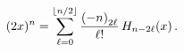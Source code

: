 \[(2x)^{n}=\sum_{\ell=0}^{\left\lfloor n/2\right\rfloor}\frac{\left(-n\right)_{2%
\ell}}{\ell!}\mathop{H_{n-2\ell}\/}\nolimits\!\left(x\right).\]